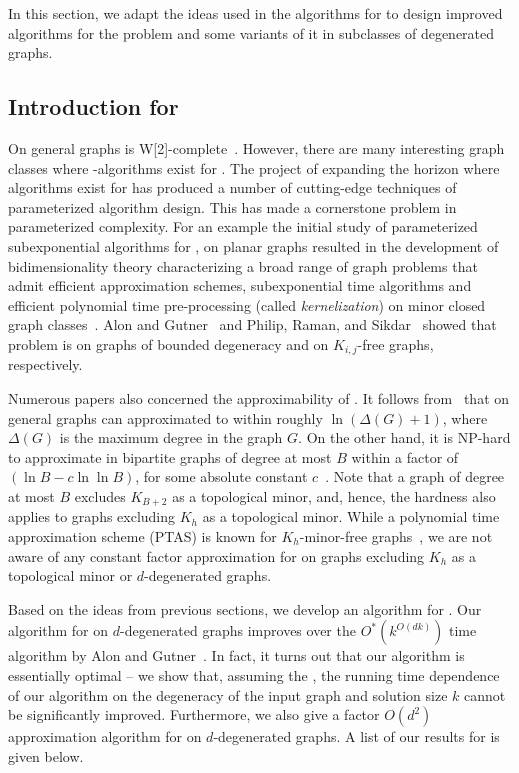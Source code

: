In this section, we adapt the ideas used in the algorithms for {\dst} to design improved algorithms for the {\ds} problem and some variants of it in subclasses of degenerated graphs.

\subsection{Introduction for \ds{}}

On general graphs {\ds} is W[2]-com\-ple\-te~\cite{DF99}. However, there are many interesting graph classes where {\FPT}-algorithms exist for {\ds}. The project of expanding the horizon where \FPT{} algorithms exist for \ds{} has produced a number of cutting-edge techniques of parameterized algorithm design. This has made {\ds} a cornerstone problem in parameterized complexity. For an example the initial study of parameterized subexponential algorithms for {\ds}, on planar graphs \cite{AlberBFKN02,FominT06} resulted in the development of bidimensionality theory characterizing a broad range of graph problems  that admit efficient approximation schemes, subexponential time \FPT{} algorithms and efficient polynomial time pre-processing (called {\em kernelization}) on minor closed graph classes~\cite{DemaineFHT05sub,DemaineHaj05}. Alon and Gutner~\cite{AlonG09} and Philip, Raman, and Sikdar~\cite{PhilipRS09} showed that \ds{} problem is {\FPT} on graphs of bounded degeneracy and on $K_{i,j}$-free graphs,  
respectively.

Numerous papers also concerned the approximability of \ds{}. It follows from~\cite{DuhF97} that \ds{} on general graphs can approximated to within roughly $\ln(\Delta(G)+1)$, where $\Delta(G)$ is the maximum degree in the graph $G$. On the other hand, it is NP-hard to approximate \ds{} in bipartite graphs of degree at most $B$ within a factor of $(\ln B - c\ln \ln B)$, for some absolute constant $c$~\cite{ChlebikC08}. Note that a graph of degree at most $B$ excludes $K_{B+2}$ as a topological minor, and, hence, the hardness also applies to graphs excluding $K_h$ as a topological minor. While a polynomial time approximation scheme (PTAS) is known for $K_h$-minor-free graphs~\cite{Grohe03}, we are not aware of any constant factor approximation for \ds{} on graphs excluding $K_h$ as a topological minor or $d$-degenerated graphs.



Based on the ideas from previous sections, we develop an algorithm for \ds{}.
Our algorithm for {\ds} on $d$-degenerated graphs improves over the $O^*(k^{O(dk)})$ time algorithm by Alon and Gutner~\cite{AlonG09}. In fact, it turns out that our algorithm is essentially optimal -- we show that, assuming the \ETH{}, the running time dependence of our algorithm on the degeneracy of the input graph and solution size $k$ cannot be significantly improved. Furthermore, we also give a factor $O(d^2)$ approximation algorithm for {\ds} on $d$-degenerated graphs. A list of our results for {\ds} is given below.

